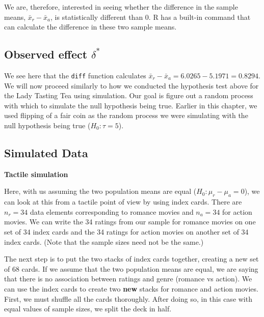 \documentclass[]{tufte-book}
\newenvironment{Shaded}{\begin{snugshade}}{\end{snugshade}}
\newcommand{\KeywordTok}[1]{\textcolor[rgb]{0.13,0.29,0.53}{\textbf{{#1}}}}
\newcommand{\DataTypeTok}[1]{\textcolor[rgb]{0.13,0.29,0.53}{{#1}}}
\newcommand{\StringTok}[1]{\textcolor[rgb]{0.31,0.60,0.02}{{#1}}}
\newcommand{\NormalTok}[1]{{#1}}
\begin{document}
We are, therefore, interested in seeing whether the difference in the
sample means, \(\bar{x}_r - \bar{x}_a\), is statistically different than
0. R has a built-in command that can calculate the difference in these
two sample means.

\subsection{\texorpdfstring{Observed effect
\(\delta^*\)}{Observed effect \textbackslash{}delta\^{}*}}\label{observed-effect-delta-1}

\begin{Shaded}
\end{Shaded}

We see here that the \texttt{diff} function calculates
\(\bar{x}_r - \bar{x}_a = 6.0265 - 5.1971 = 0.8294\). We will now
proceed similarly to how we conducted the hypothesis test above for the
Lady Tasting Tea using simulation. Our goal is figure out a random
process with which to simulate the null hypothesis being true. Earlier
in this chapter, we used flipping of a fair coin as the random process
we were simulating with the null hypothesis being true
(\(H_0: \tau = 5\)).

\subsection{Simulated Data}\label{simulated-data-1}

\textbf{Tactile simulation}

Here, with us assuming the two population means are equal
(\(H_0: \mu_r - \mu_a = 0\)), we can look at this from a tactile point
of view by using index cards. There are \(n_r = 34\) data elements
corresponding to romance movies and \(n_a = 34\) for action movies. We
can write the 34 ratings from our sample for romance movies on one set
of 34 index cards and the 34 ratings for action movies on another set of
34 index cards. (Note that the sample sizes need not be the same.)

The next step is to put the two stacks of index cards together, creating
a new set of 68 cards. If we assume that the two population means are
equal, we are saying that there is no association between ratings and
genre (romance vs action). We can use the index cards to create two
\textbf{new} stacks for romance and action movies. First, we must
shuffle all the cards thoroughly. After doing so, in this case with
equal values of sample sizes, we split the deck in half.
\end{document}
